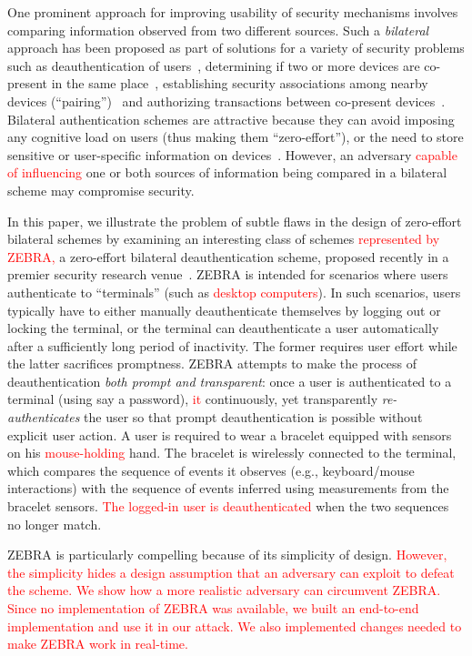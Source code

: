 \documentclass[conference]{IEEEtran}
\newcommand{\zebra}{ZEBRA\xspace}
\newcommand\changeMika[1]{\textcolor{red}{#1}}
\newcommand\changeAsokan[1]{\textcolor{red}{#1}}
\newcommand\changeMika[1]{{#1}}
\newcommand\changeAsokan[1]{{#1}}
\begin{document}
One prominent approach for improving usability of security mechanisms
involves comparing information observed from two different sources. Such
a \textit{bilateral} approach has been proposed as part of solutions
for a variety of security problems such as deauthentication of
users~\cite{mare2014zebra}, determining if two or more devices are
co-present in the same place~\cite{TruongPerCom14}, establishing
security associations among nearby devices
(``pairing'')~\cite{VanDyken+14,DBLP:journals/csur/ChongMG14} and
authorizing transactions between co-present devices~\cite{bump}.
Bilateral authentication schemes are attractive because they can avoid
imposing any cognitive load on users (thus making them
``zero-effort''), or the need to store sensitive or user-specific information on 
devices~\cite{mare2014zebra}.  However, an adversary \changeAsokan{capable of influencing} one or
both sources of information being compared in a bilateral 
scheme may compromise security.

In this paper, we illustrate the problem of subtle flaws in the design
of zero-effort bilateral schemes by examining an interesting class of schemes \changeAsokan{represented by \zebra,} a zero-effort bilateral deauthentication scheme, proposed
recently in a premier security research venue~\cite{mare2014zebra}.
\zebra is intended for scenarios where users authenticate to ``terminals'' (such as \changeAsokan{desktop computers}). In such scenarios, users typically have
to either manually deauthenticate themselves by logging out or locking the
terminal, or the terminal can deauthenticate a user automatically after
a sufficiently long period of inactivity. The former requires user
effort while the latter sacrifices promptness. \zebra attempts to make
the process of deauthentication \textit{both prompt and transparent}: once a
user is authenticated to a terminal (using say a password), \changeAsokan{it} continuously,
yet transparently \textit{re-authenticates} the user so that prompt
deauthentication is possible without explicit user action. A user is required to wear a bracelet equipped with sensors on his
\changeMika{mouse-holding} hand. The bracelet is wirelessly connected to
the terminal, which compares the sequence of events it observes
(e.g., keyboard/mouse interactions) with the sequence of events
inferred using measurements from the bracelet
sensors. \changeAsokan{The logged-in user is deauthenticated} when the two sequences no
longer match. 

\zebra is particularly compelling because of its
simplicity of design. \changeAsokan{However, the simplicity hides a design assumption that an adversary can exploit to defeat the scheme. We show how a more realistic adversary can circumvent ZEBRA. Since no implementation of ZEBRA was available, we built an end-to-end implementation and use it in our attack. We also implemented changes needed to make ZEBRA work in real-time.}
\end{document}
